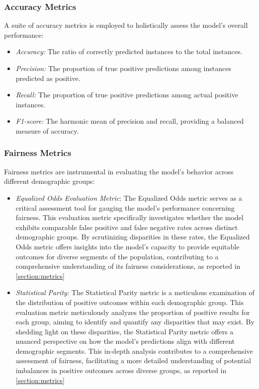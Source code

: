 \subsubsection{Accuracy Metrics}

A suite of accuracy metrics is employed to holistically assess the model's overall performance:

\begin{itemize}
    \item \emph{Accuracy:} The ratio of correctly predicted instances to the total instances.
    
    \item \emph{Precision:} The proportion of true positive predictions among instances predicted as positive.
    
    \item \emph{Recall:} The proportion of true positive predictions among actual positive instances.
    
    \item \emph{F1-score:} The harmonic mean of precision and recall, providing a balanced measure of accuracy.
\end{itemize}

\subsubsection{Fairness Metrics}

Fairness metrics are instrumental in evaluating the model's behavior across different demographic groups:

\begin{itemize}
    
    \item \emph{Equalized Odds Evaluation Metric}: The Equalized Odds metric serves as a critical assessment tool for gauging the model's performance concerning fairness. This evaluation metric specifically investigates whether the model exhibits comparable false positive and false negative rates across distinct demographic groups. By scrutinizing disparities in these rates, the Equalized Odds metric offers insights into the model's capacity to provide equitable outcomes for diverse segments of the population, contributing to a comprehensive understanding of its fairness considerations, as reported in \cref{section:metrics}
    
    \item \emph{Statistical Parity:} The Statistical Parity metric is a meticulous examination of the distribution of positive outcomes within each demographic group. This evaluation metric meticulously analyzes the proportion of positive results for each group, aiming to identify and quantify any disparities that may exist. By shedding light on these disparities, the Statistical Parity metric offers a nuanced perspective on how the model's predictions align with different demographic segments. This in-depth analysis contributes to a comprehensive assessment of fairness, facilitating a more detailed understanding of potential imbalances in positive outcomes across diverse groups, as reported in \cref{section:metrics}

\end{itemize}

